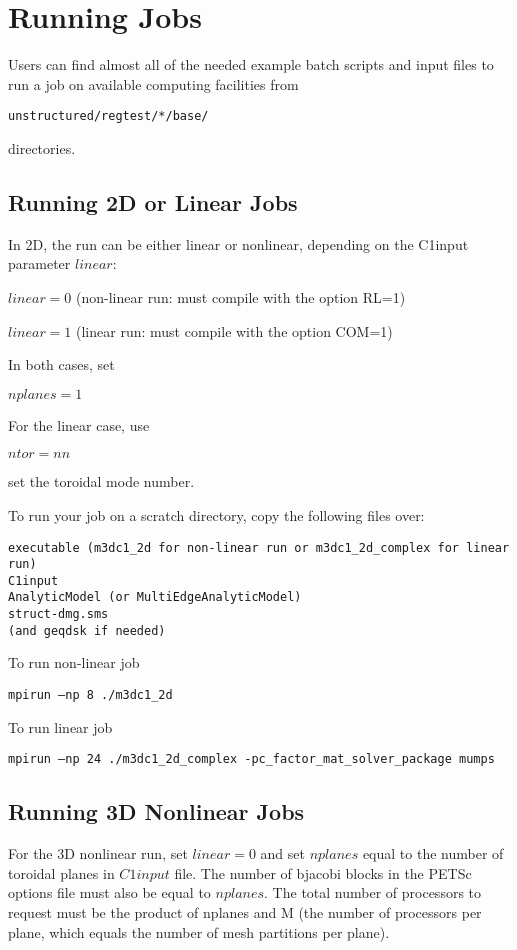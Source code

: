 \section{Running Jobs}

\noindent
Users can find almost all of the needed example batch scripts and input files to run a job on available computing facilities from 
\begin{verbatim}
unstructured/regtest/*/base/
\end{verbatim}

\noindent
directories.

\subsection{Running 2D or Linear Jobs}

\noindent
In 2D, the run can be either linear or nonlinear, depending on the C1input parameter $linear$:

$linear=0$ (non-linear run: must compile with the option RL=1)

$linear=1$ (linear run: must compile with the option COM=1)

\noindent
In both cases, set 

$nplanes=1$

For the linear case, use

$ntor=nn$

set the toroidal mode number.

\noindent
To run your job on a scratch directory, copy the following files over:
\begin{verbatim}
executable (m3dc1_2d for non-linear run or m3dc1_2d_complex for linear run)
C1input
AnalyticModel (or MultiEdgeAnalyticModel)
struct-dmg.sms
(and geqdsk if needed)
\end{verbatim}

To run non-linear job
\begin{verbatim}
mpirun –np 8 ./m3dc1_2d
\end{verbatim}

To run linear job
\begin{verbatim}
mpirun –np 24 ./m3dc1_2d_complex -pc_factor_mat_solver_package mumps 
\end{verbatim}

\subsection{Running 3D Nonlinear Jobs}

\noindent
For the 3D nonlinear run, set $linear=0$ and set $nplanes$ equal to the number of toroidal planes in $C1input$ file. The
number of bjacobi blocks in the PETSc options file must also be equal to $nplanes$. The
total number of processors to request must be the product of nplanes and M (the number of processors per plane, which equals the number of mesh partitions per plane).

